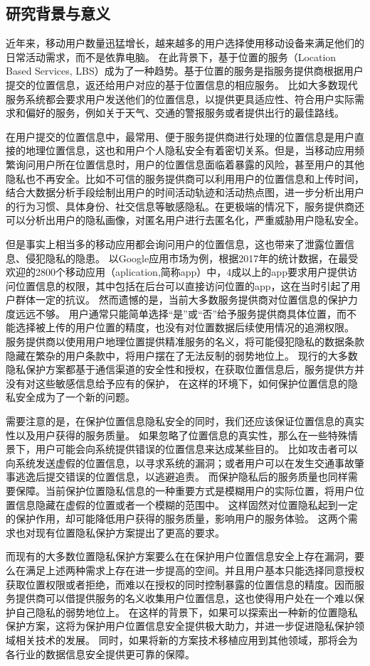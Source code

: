 \documentclass[zihao=-4]{ctexart}
\begin{document}
\subsection{研究背景与意义}
近年来，移动用户数量迅猛增长，越来越多的用户选择使用移动设备来满足他们的日常活动需求，而不是依靠电脑。
\cite{czh_1.1}在此背景下，基于位置的服务（Location Based Services, LBS）成为了一种趋势。基于位置的服务是指服务提供商根据用户提交的位置信息，返还给用户对应的基于位置信息的相应服务。
比如大多数现代服务系统都会要求用户发送他们的位置信息，以提供更具适应性、符合用户实际需求和偏好的服务，例如关于天气、交通的警报服务或者提供出行的最佳路线。\cite{czh_1.2}
\par
在用户提交的位置信息中，最常用、便于服务提供商进行处理的位置信息是用户直接的地理位置信息，这也和用户个人隐私安全有着密切关系。但是，当移动应用频繁询问用户所在位置信息时，用户的位置信息面临着暴露的风险，甚至用户的其他隐私也不再安全。比如不可信的服务提供商可以利用用户的位置信息和上传时间，结合大数据分析手段绘制出用户的时间活动轨迹和活动热点图，进一步分析出用户的行为习惯、具体身份、社交信息等敏感隐私。在更极端的情况下，服务提供商还可以分析出用户的隐私画像，对匿名用户进行去匿名化，严重威胁用户隐私安全。
\par
但是事实上相当多的移动应用都会询问用户的位置信息，这也带来了泄露位置信息、侵犯隐私的隐患。
以Google应用市场为例，根据2017年的统计数据，在最受欢迎的2800个移动应用（aplication,简称app）中，4成以上的app要求用户提供访问位置信息的权限，其中包括在后台可以直接访问位置的app，\cite{czh_1.3}这在当时引起了用户群体一定的抗议。
然而遗憾的是，当前大多数服务提供商对位置信息的保护力度远远不够。
用户通常只能简单选择“是”或“否”给予服务提供商具体位置，而不能选择被上传的用户位置的精度，也没有对位置数据后续使用情况的追溯权限。
服务提供商以使用用户地理位置提供精准服务的名义，将可能侵犯隐私的数据条款隐藏在繁杂的用户条款中，将用户摆在了无法反制的弱势地位上。
现行的大多数隐私保护方案都基于通信渠道的安全性和授权，在获取位置信息后，服务提供方并没有对这些敏感信息给予应有的保护，
\cite{czh_1.4}在这样的环境下，如何保护位置信息的隐私安全成为了一个新的问题。
\par
需要注意的是，在保护位置信息隐私安全的同时，我们还应该保证位置信息的真实性以及用户获得的服务质量。
如果忽略了位置信息的真实性，那么在一些特殊情景下，用户可能会向系统提供错误的位置信息来达成某些目的。
比如攻击者可以向系统发送虚假的位置信息，以寻求系统的漏洞；或者用户可以在发生交通事故肇事逃逸后提交错误的位置信息，以逃避追责\cite{czh_1.5}。
而保护隐私后的服务质量也同样需要保障。当前保护位置隐私信息的一种重要方式是模糊用户的实际位置，将用户位置信息隐藏在虚假的位置或者一个模糊的范围中。
这样固然对位置隐私起到一定的保护作用，却可能降低用户获得的服务质量，影响用户的服务体验。
这两个需求也对现有位置隐私保护方案提出了更高的要求。
\par
而现有的大多数位置隐私保护方案要么在在保护用户位置信息安全上存在漏洞，要么在满足上述两种需求上存在进一步提高的空间。并且用户基本只能选择同意授权获取位置权限或者拒绝，而难以在授权的同时控制暴露的位置信息的精度。因而服务提供商可以借提供服务的名义收集用户位置信息，这也使得用户处在一个难以保护自己隐私的弱势地位上。
在这样的背景下，如果可以探索出一种新的位置隐私保护方案，这将为保护用户位置信息安全提供极大助力，并进一步促进隐私保护领域相关技术的发展。
同时，如果将新的方案技术移植应用到其他领域，那将会为各行业的数据信息安全提供更可靠的保障。
\end{document}
